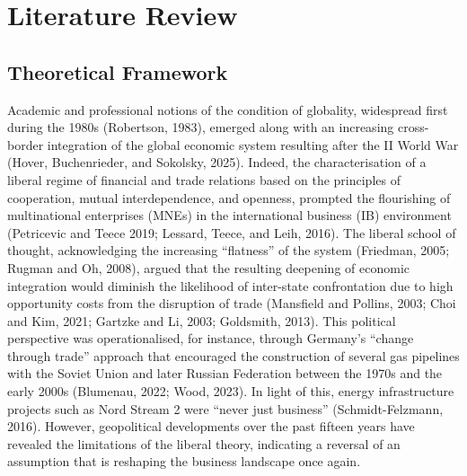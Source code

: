 \documentclass[12pt,a4paper]{article}
\begin{document}
\section{Literature Review}
\label{sec:lit}

\subsection{Theoretical Framework}

Academic and professional notions of the condition of globality, widespread first during the 1980s (Robertson, 1983), emerged along with an increasing cross-border integration of the global economic system resulting after the II World War (Hover, Buchenrieder, and Sokolsky, 2025). Indeed, the characterisation of a liberal regime of financial and trade relations based on the principles of cooperation, mutual interdependence, and openness, prompted the flourishing of multinational enterprises (MNEs) in the international business (IB) environment (Petricevic and Teece 2019; Lessard, Teece, and Leih, 2016). The liberal school of thought, acknowledging the increasing ``flatness'' of the system (Friedman, 2005; Rugman and Oh, 2008), argued that the resulting deepening of economic integration would diminish the likelihood of inter-state confrontation due to high opportunity costs from the disruption of trade (Mansfield and Pollins, 2003; Choi and Kim, 2021; Gartzke and Li, 2003; Goldsmith, 2013). This political perspective was operationalised, for instance, through Germany's ``change through trade'' approach that encouraged the construction of several gas pipelines with the Soviet Union and later Russian Federation between the 1970s and the early 2000s (Blumenau, 2022; Wood, 2023). In light of this, energy infrastructure projects such as Nord Stream 2 were ``never just business'' (Schmidt-Felzmann, 2016). However, geopolitical developments over the past fifteen years have revealed the limitations of the liberal theory, indicating a reversal of an assumption that is reshaping the business landscape once again.
\end{document}
